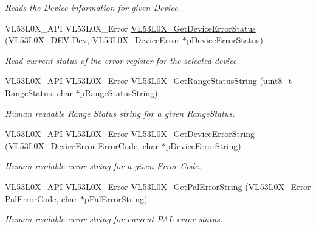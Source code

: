 \begin{DoxyCompactItemize}
\begin{DoxyCompactList}\small\item\em Reads the Device information for given Device. \end{DoxyCompactList}\item 
V\+L53\+L0\+X\+\_\+\+A\+PI V\+L53\+L0\+X\+\_\+\+Error \hyperlink{group__VL53L0X__general__group_gad8bd4b6c24974fd55102615aed0efa14}{V\+L53\+L0\+X\+\_\+\+Get\+Device\+Error\+Status} (\hyperlink{group__VL53L0X__platform__group_ga2d6405308b1dd524b462f1b8fb97d167}{V\+L53\+L0\+X\+\_\+\+D\+EV} Dev, V\+L53\+L0\+X\+\_\+\+Device\+Error $\ast$p\+Device\+Error\+Status)
\begin{DoxyCompactList}\small\item\em Read current status of the error register for the selected device. \end{DoxyCompactList}\item 
V\+L53\+L0\+X\+\_\+\+A\+PI V\+L53\+L0\+X\+\_\+\+Error \hyperlink{group__VL53L0X__general__group_gad9a6d74d1c0b18a2180b896dc144ad7c}{V\+L53\+L0\+X\+\_\+\+Get\+Range\+Status\+String} (\hyperlink{vl53l0x__types_8h_aba7bc1797add20fe3efdf37ced1182c5}{uint8\+\_\+t} Range\+Status, char $\ast$p\+Range\+Status\+String)
\begin{DoxyCompactList}\small\item\em Human readable Range Status string for a given Range\+Status. \end{DoxyCompactList}\item 
V\+L53\+L0\+X\+\_\+\+A\+PI V\+L53\+L0\+X\+\_\+\+Error \hyperlink{group__VL53L0X__general__group_ga3532722a77431334a391fb8247cd334f}{V\+L53\+L0\+X\+\_\+\+Get\+Device\+Error\+String} (V\+L53\+L0\+X\+\_\+\+Device\+Error Error\+Code, char $\ast$p\+Device\+Error\+String)
\begin{DoxyCompactList}\small\item\em Human readable error string for a given Error Code. \end{DoxyCompactList}\item 
V\+L53\+L0\+X\+\_\+\+A\+PI V\+L53\+L0\+X\+\_\+\+Error \hyperlink{group__VL53L0X__general__group_gaa647e7ed8b78178968fab9b3562ebac7}{V\+L53\+L0\+X\+\_\+\+Get\+Pal\+Error\+String} (V\+L53\+L0\+X\+\_\+\+Error Pal\+Error\+Code, char $\ast$p\+Pal\+Error\+String)
\begin{DoxyCompactList}\small\item\em Human readable error string for current P\+AL error status. \end{DoxyCompactList}\item 

\end{DoxyCompactItemize}
